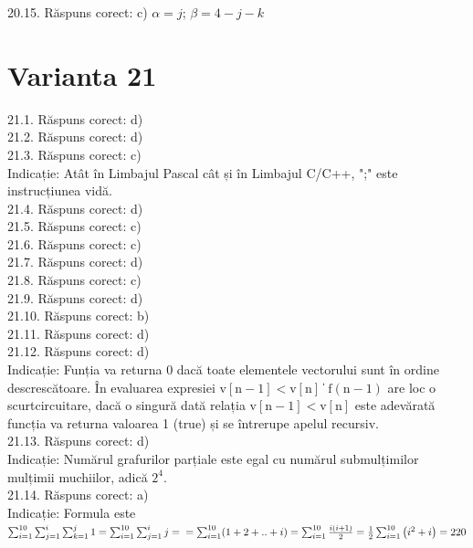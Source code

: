 20.15. Răspuns corect: c) $\alpha=j$; $\beta=4-j-k$\\

\section*{Varianta 21}

21.1. Răspuns corect: d)\\

21.2. Răspuns corect: d)\\

21.3. Răspuns corect: c)\\
Indicație: Atât în Limbajul Pascal cât și în Limbajul C/C++, ";" este instrucțiunea vidă.\\

21.4. Răspuns corect: d)\\

21.5. Răspuns corect: c)\\

21.6. Răspuns corect: c)\\

21.7. Răspuns corect: d)\\

21.8. Răspuns corect: c)\\

21.9. Răspuns corect: d)\\

21.10. Răspuns corect: b)\\

21.11. Răspuns corect: d)\\

21.12. Răspuns corect: d)\\
Indicație: Funția va returna 0 dacă toate elementele vectorului sunt în ordine descrescătoare. În evaluarea expresiei $\mathrm{v}[\mathrm{n}-1]<\mathrm{v}[\mathrm{n}]$ \| $\mathrm{f}(\mathrm{n}-1)$ are loc o scurtcircuitare, dacă o singură dată relația $\mathrm{v}[\mathrm{n}-1]<\mathrm{v}[\mathrm{n}]$ este adevărată funcția va returna valoarea 1 (true) și se întrerupe apelul recursiv.\\

21.13. Răspuns corect: d)\\
Indicație: Numărul grafurilor parțiale este egal cu numărul submulțimilor mulțimii muchiilor, adică $2^{4}$.\\

21.14. Răspuns corect: a)\\
Indicație: Formula este $\sum_{i=1}^{10} \sum_{j=1}^{i} \sum_{k=1}^{j} 1=\sum_{i=1}^{10} \sum_{j=1}^{i} j= \\ =\sum_{i=1}^{10}(1+2+. .+i)=\sum_{i=1}^{10} \frac{i(i+1)}{2}=\frac{1}{2} \sum_{i=1}^{10}\left(i^{2}+i\right)=220$\\

